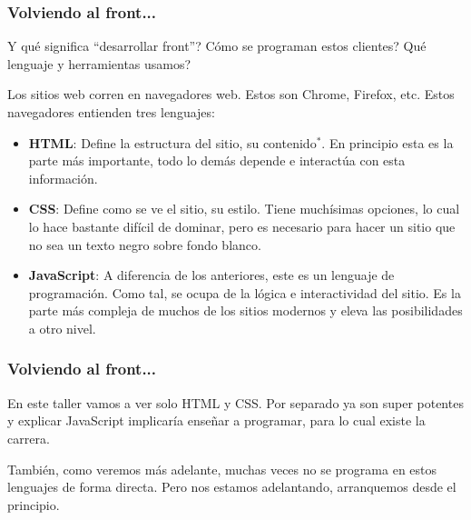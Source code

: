 \begin{frame}
    \frametitle{Volviendo al front...}

    Y qué significa ``desarrollar front''? Cómo se programan estos clientes? 
    Qué lenguaje y herramientas usamos?

    Los sitios web corren en navegadores web. Estos son Chrome, Firefox, etc. 
    Estos navegadores entienden tres lenguajes:

    \begin{itemize}
        \item \textbf{HTML}: Define la estructura del sitio, su contenido$^*$. 
              En principio esta es la parte más importante, todo lo demás 
              depende e interactúa con esta información.
        \item \textbf{CSS}: Define como se ve el sitio, su estilo. Tiene muchísimas 
              opciones, lo cual lo hace bastante difícil de dominar, pero es 
              necesario para hacer un sitio que no sea un texto negro sobre fondo 
              blanco.
        \item \textbf{JavaScript}: A diferencia de los anteriores, este es un 
              lenguaje de programación. Como tal, se ocupa de la lógica e 
              interactividad del sitio. Es la parte más compleja de muchos 
              de los sitios modernos y eleva las posibilidades a otro nivel.
    \end{itemize}

\end{frame}

\begin{frame}
    \frametitle{Volviendo al front...}

    En este taller vamos a ver solo HTML y CSS. Por separado ya son super 
    potentes y explicar JavaScript implicaría enseñar a programar, para 
    lo cual existe la carrera.

    También, como veremos más adelante, muchas veces no se programa en 
    estos lenguajes de forma directa. Pero nos estamos adelantando, 
    arranquemos desde el principio.

\end{frame}
